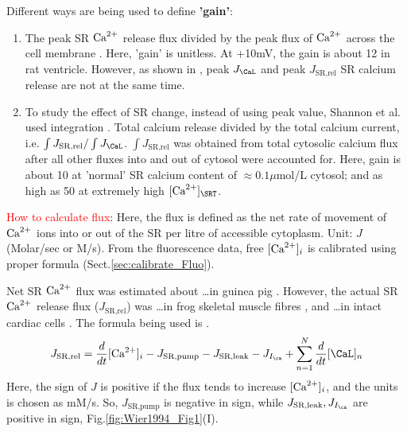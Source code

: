 Different ways are being used to define
{\bf 'gain'}:
\begin{enumerate}
  \item The peak SR ${\text{Ca}^{2+}}$ release flux divided by the peak flux of ${\text{Ca}^{2+}}$ across
  the cell membrane \citep{wier1994lce}. Here, 'gain' is unitless. At +10mV, the
  gain is about 12 in rat ventricle. However, as shown in
  \citep{shannon2000pfs}, peak $J_\CaL$ and peak $J_\text{SR,rel}$ SR calcium
  release are not at the same time.\footnotemark[1] 
    
  \item To study the effect of SR change, instead of using peak value, Shannon
  et al. used integration  \citep{shannon2000pfs}. Total calcium release divided
  by the total calcium current, i.e. $\int J_\text{SR,rel}/\int J_\CaL$.
  $\int J_\text{SR,rel}$ was obtained from total cytosolic calcium flux after
  all other fluxes into and out of cytosol were accounted for. Here, gain is
  about 10 at 'normal' SR calcium content of $\approx 0.1\mu$mol/L cytosol; and
  as high as 50 at extremely high $[\Ca]_\SRT$.
\end{enumerate}


\begin{framed}

\textcolor{red}{How to calculate flux}:   Here, the flux is defined as the net
rate of movement of ${\text{Ca}^{2+}}$ ions into or out of the SR per litre of accessible
cytoplasm. Unit: $J$ (Molar/sec or M/s). From the fluorescence data, free
$[{\text{Ca}^{2+}}]_i$ is calibrated using proper formula (Sect.\ref{sec:calibrate_Fluo}). 

\end{framed}

Net SR ${\text{Ca}^{2+}}$ flux was estimated about \ldots in guinea pig \citep{sipido1991}.
However, the actual SR ${\text{Ca}^{2+}}$ release flux ($J_\text{SR,rel}$) was \ldots in frog
skeletal muscle fibres \citep{rios1989}, and \ldots in intact cardiac cells
\citep{wier1994lce}. The formula being used is \citep{wier1994lce}.
\begin{equation}
J_\text{SR,rel} = \frac{d}{dt}[\Ca]_i - J_\text{SR,pump} - J_\text{SR,leak} -
J_{I_\ca} + \sum^N_{n=1} \frac{d}{dt}[\CaL]_n
\end{equation}
Here, the sign of $J$ is positive if the flux tends to increase $[{\text{Ca}^{2+}}]_i$, and
the units is chosen as mM/s. So, $J_\text{SR,pump}$ is negative in sign, while
$J_\text{SR,leak}, J_{I_\ca}$ are positive in sign,
Fig.\ref{fig:Wier1994_Fig1}(I).

